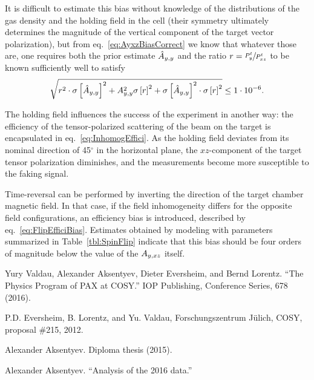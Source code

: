\documentclass{article}
\begin{document}
It is difficult to estimate this bias without knowledge of the distributions of the gas density and the holding field in the cell (their symmetry ultimately determines the magnitude of the vertical component of the target vector polarization), but from eq.~\eqref{eq:AyxzBiasCorrect} we know that whatever those are, one requires both the prior estimate $\Ayy*$ and the ratio $r = \sfrac{P^t_y}{P^t_{xz}}$ to be known sufficiently well to satisfy
\begin{equation}
	\sqrt{r^2 \cdot\SE{\Ayy*}^2 + \Ayy^2\SE{r}^2 + \SE{\Ayy*}^2\cdot\SE{r}^2} \leq 1\cdot10^{-6}.
\end{equation}

The holding field influences the success of the experiment in another way: the efficiency of the tensor-polarized scattering of the beam on the target is encapsulated in eq.~\eqref{eq:InhomogEffici}. As the holding field deviates from its nominal direction of 45$^\circ$ in the horizontal plane, the $xz$-component of the target tensor polarization diminishes, and the measurements become more susceptible to the faking signal.

Time-reversal can be performed by inverting the direction of the target chamber magnetic field. In that case, if the field inhomogeneity differs for the opposite field configurations, an efficiency bias is introduced, described by eq.~\eqref{eq:FlipEfficiBias}. Estimates obtained by modeling with parameters summarized in Table~\ref{tbl:SpinFlip} indicate that this bias should be four orders of magnitude below the value of the $\Ayxz$ itself.

\begin{thebibliography}{9}
	Yury Valdau, Alexander Aksentyev, Dieter Eversheim, and Bernd Lorentz. ``The Physics Program of PAX at COSY.'' IOP Publishing, Conference Series, 678 (2016).
	
	
		
	P.D. Eversheim, B. Lorentz, and Yu. Valdau, Forschungszentrum J\"ulich, COSY, proposal \#215, 2012.
	
	Alexander Aksentyev. Diploma thesis (2015).
	
	Alexander Aksentyev. ``Analysis of the 2016 data.''
\end{thebibliography}
\end{document}
